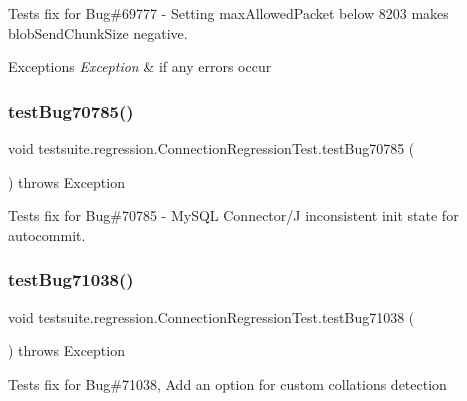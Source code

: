 Tests fix for Bug\#69777 -\/ Setting max\+Allowed\+Packet below 8203 makes blob\+Send\+Chunk\+Size negative.


\begin{DoxyExceptions}{Exceptions}
{\em Exception} & if any errors occur \\
\hline
\end{DoxyExceptions}
\mbox{\label{classtestsuite_1_1regression_1_1_connection_regression_test_a2e9ffad8504db4b26677d74c5f5b0a65}} 
\subsubsection{\texorpdfstring{test\+Bug70785()}{testBug70785()}}
{\footnotesize\ttfamily void testsuite.\+regression.\+Connection\+Regression\+Test.\+test\+Bug70785 (\begin{DoxyParamCaption}{ }\end{DoxyParamCaption}) throws Exception}

Tests fix for Bug\#70785 -\/ My\+S\+QL Connector/J inconsistent init state for autocommit. \mbox{\label{classtestsuite_1_1regression_1_1_connection_regression_test_af4f6635f25a74604468a8f9445e365ba}} 
\subsubsection{\texorpdfstring{test\+Bug71038()}{testBug71038()}}
{\footnotesize\ttfamily void testsuite.\+regression.\+Connection\+Regression\+Test.\+test\+Bug71038 (\begin{DoxyParamCaption}{ }\end{DoxyParamCaption}) throws Exception}

Tests fix for Bug\#71038, Add an option for custom collations detection


